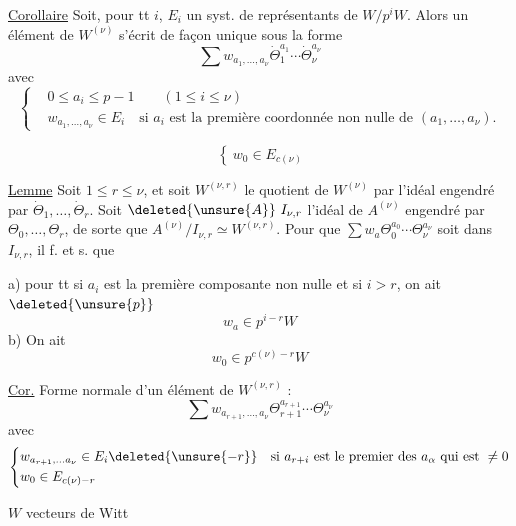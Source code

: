 \margin{!}

\uline{Corollaire} Soit, pour tt $i$, $E_i$ un syst. de représentants de $W/p^iW$. Alors un élément de $W^{(\nu)}$ s'écrit de façon unique sous la forme
\[
\sum w_{a_1,\ldots,a_\nu}\dot{\Theta}_1^{a_1}\cdots\dot{\Theta}_\nu^{a_\nu}
\]
avec
\[
\left\{\begin{aligned}
&0\leq a_i\leq p-1\qquad(1\leq i\leq\nu)\\
&w_{a_1,\ldots,a_\nu}\in E_i\quad\text{si }a_i\text{ est la première coordonnée non nulle de }(a_1,\ldots,a_\nu).
\end{aligned}\right.
\]


\[
\left\{\ w_0\in E_{c(\nu)}\right.
\]

\uline{Lemme} Soit $1\leq r\leq\nu$, et soit $W^{(\nu,r)}$ le quotient de $W^{(\nu)}$ par l'idéal engendré par $\dot{\Theta}_1,\ldots,\dot{\Theta}_r$.  Soit $\deleted{\unsure{A}}\ I_{\nu,r}$ l'idéal de $A^{(\nu)}$ engendré par $\Theta_0,\ldots,\Theta_r$, de sorte que $A^{(\nu)}/I_{\nu,r}\simeq W^{(\nu,r)}$. Pour que $\sum w_a\Theta_0^{a_0}\cdots\Theta_\nu^{a_\nu}$ soit dans $I_{\nu,r}$, il f. et s. que

a) pour tt    si $a_i$ est la première composante non nulle et si $i>r$, on ait $\deleted{\unsure{p}}$
\[
w_a\in p^{i-r}W
\]
b) On ait
\[
w_0\in p^{c(\nu)-r}W
\]

\uline{Cor.} Forme normale d'un élément de $W^{(\nu,r)}$ :
\[
\sum w_{a_{r+1},\ldots,a_\nu}\Theta_{r+1}^{a_{r+1}}\cdots\Theta_\nu^{a_\nu}
\]
avec
\[
\left\{\begin{aligned}
&w_{a_{r+1},\ldots a_\nu}\in E_i\deleted{\unsure{-r}}\quad\text{si }a_{r+i}\text{ est le premier des }a_\alpha\text{ qui est }\ne0\\
&w_0\in E_{c(\nu)-r}
\end{aligned}\right.
\]


$W$ vecteurs de Witt

